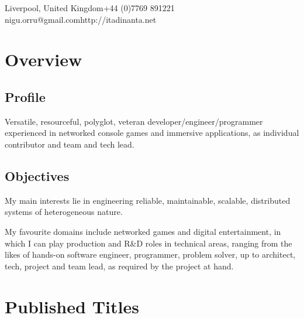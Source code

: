 \documentclass[a4paper,10pt]{article}
\begin{document}
    {Liverpool, United Kingdom}{+44 (0)7769 891221}
    {nigu.orru@gmail.com}{http://itadinanta.net}


    \section{Overview}

        \subsection{Profile}
            Versatile, resourceful, polyglot, veteran developer/engineer/programmer experienced in networked console
            games and immersive applications, as individual contributor and team and tech lead.

        \subsection{Objectives}
            My main interests lie in engineering reliable, maintainable, scalable, distributed systems of
            heterogeneous nature. \vspace{0.25em}

            My favourite domains include networked games and digital entertainment, in which I can play production
            and R\&D roles in technical areas, ranging from the likes of hands-on software engineer, programmer,
            problem solver, up to architect, tech, project and team lead, as required by the project at hand.


    \section{Published Titles}
\end{document}
